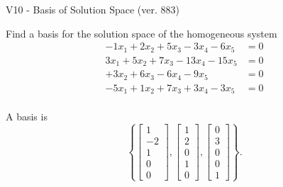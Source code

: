 \begin{exercise}
  \begin{exerciseTitle}V10 - Basis of Solution Space (ver. 883)\end{exerciseTitle}
  \begin{exerciseStatement}
    Find a basis for the solution space of the homogeneous system 
\begin{align*}
 -1 x_ 1 + 2 x_ 2 + 5 x_ 3 -3 x_ 4 -6 x_ 5 &= 0  \\ 
  3 x_ 1 + 5 x_ 2 + 7 x_ 3 -13 x_ 4 -15 x_ 5 &= 0  \\ 
  + 3 x_ 2 + 6 x_ 3 -6 x_ 4 -9 x_ 5 &= 0  \\ 
  -5 x_ 1 + 1 x_ 2 + 7 x_ 3 + 3 x_ 4 -3 x_ 5 &= 0  \\ 
 \end{align*}


 
  \end{exerciseStatement}

  \begin{exerciseAnswer}
   A basis is   
\[\left\{\left[\begin{array}{c}
1 \\
-2 \\
1 \\
0 \\
0
\end{array}\right] , \left[\begin{array}{c}
1 \\
2 \\
0 \\
1 \\
0
\end{array}\right] , \left[\begin{array}{c}
0 \\
3 \\
0 \\
0 \\
1
\end{array}\right]\right\}.\]

  


  \end{exerciseAnswer}
\end{exercise}